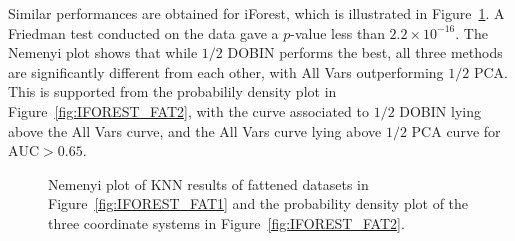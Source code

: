 \documentclass[11pt]{article}
\begin{document}
Similar performances are obtained for iForest, which is illustrated in Figure~\ref{fig:IFOREST_FAT}. A Friedman test conducted on the data gave a $p$-value less than $2.2 \times 10^{-16}$. The Nemenyi plot shows that while $1/2$ DOBIN performs the best, all three methods are significantly different from each other, with All Vars outperforming $1/2$ PCA. This is supported from the probabilily density plot in Figure~\ref{fig:IFOREST_FAT2}, with the curve associated to $1/2$ DOBIN lying above the All Vars curve, and the All Vars curve lying above $1/2$ PCA curve for $\text{AUC} > 0.65$. 
\begin{figure}[!h]
	\centering
	\caption{Nemenyi plot of KNN results of fattened datasets in Figure~\ref{fig:IFOREST_FAT1} and the probability density plot of the three coordinate systems in Figure~\ref{fig:IFOREST_FAT2}. }
	\label{fig:IFOREST_FAT}
\end{figure}
\end{document}
